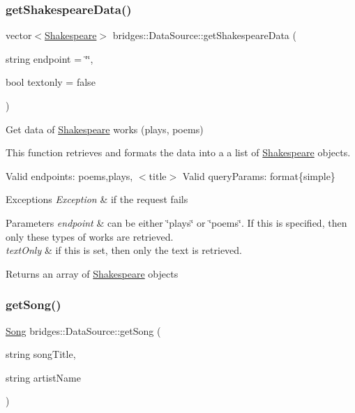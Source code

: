 \subsubsection{\texorpdfstring{get\+Shakespeare\+Data()}{getShakespeareData()}}
{\footnotesize\ttfamily vector$<$\mbox{\hyperlink{classbridges_1_1_shakespeare}{Shakespeare}}$>$ bridges\+::\+Data\+Source\+::get\+Shakespeare\+Data (\begin{DoxyParamCaption}\item[{string}]{endpoint = {\ttfamily \char`\"{}\char`\"{}},  }\item[{bool}]{textonly = {\ttfamily false} }\end{DoxyParamCaption})\hspace{0.3cm}{\ttfamily [inline]}}

Get data of \mbox{\hyperlink{classbridges_1_1_shakespeare}{Shakespeare}} works (plays, poems)

This function retrieves and formats the data into a a list of \mbox{\hyperlink{classbridges_1_1_shakespeare}{Shakespeare}} objects.

Valid endpoints\+: \textquotesingle{}poems\textquotesingle{},\textquotesingle{}plays\textquotesingle{}, $<$title$>$ Valid query\+Params\+: format\{simple\}


\begin{DoxyExceptions}{Exceptions}
{\em Exception} & if the request fails\\
\hline
\end{DoxyExceptions}

\begin{DoxyParams}{Parameters}
{\em endpoint} & can be either \char`\"{}plays\char`\"{} or \char`\"{}poems\char`\"{}. If this is specified, then only these types of works are retrieved. \\
\hline
{\em text\+Only} & if this is set, then only the text is retrieved.\\
\hline
\end{DoxyParams}
\begin{DoxyReturn}{Returns}
an array of \mbox{\hyperlink{classbridges_1_1_shakespeare}{Shakespeare}} objects 
\end{DoxyReturn}
\mbox{\label{classbridges_1_1_data_source_a284c9d572415b67df6989ab8ab97d0e2}} 
\subsubsection{\texorpdfstring{get\+Song()}{getSong()}}
{\footnotesize\ttfamily \mbox{\hyperlink{classbridges_1_1_song}{Song}} bridges\+::\+Data\+Source\+::get\+Song (\begin{DoxyParamCaption}\item[{string}]{song\+Title,  }\item[{string}]{artist\+Name }\end{DoxyParamCaption})\hspace{0.3cm}{\ttfamily [inline]}}

